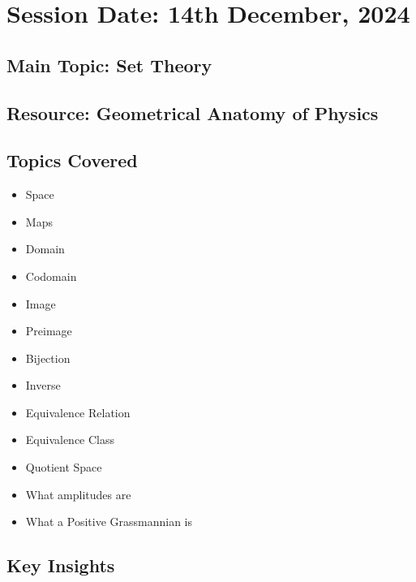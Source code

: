 \section{Session Date: 14th December, 2024}
\subsection*{Main Topic: Set Theory}
\subsection*{Resource: Geometrical Anatomy of Physics}
\subsection*{Topics Covered}
\begin{itemize}
    \item Space
    \item Maps
    \item Domain
    \item Codomain
    \item Image
    \item Preimage
    \item Bijection
    \item Inverse
    \item Equivalence Relation
    \item Equivalence Class
    \item Quotient Space
    \item What amplitudes are
    \item What a Positive Grassmannian is
\end{itemize}

\subsection*{Key Insights}
